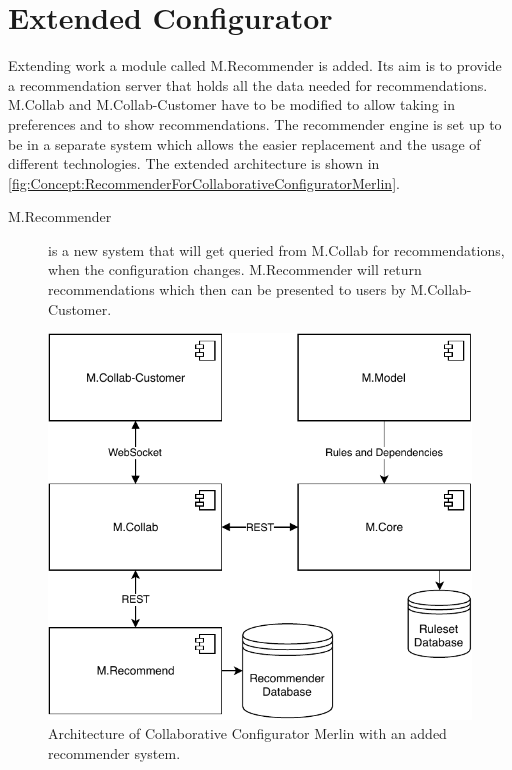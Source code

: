 \section{Extended Configurator}
\label{sec:Concept:ExtendedConfigurator}

Extending \citeauthor{raabKollaborativeProduktkonfigurationEchtzeit2019} work a module called M.Recommender is added. Its aim is to provide a recommendation server that holds all the data needed for recommendations. M.Collab and M.Collab-Customer have to be modified to allow taking in preferences and to show  recommendations. The recommender engine is set up to be in a separate system which allows the easier replacement and the usage of different technologies. The extended architecture is shown in \autoref{fig:Concept:RecommenderForCollaborativeConfiguratorMerlin}.

\begin{description}
    \item[M.Recommender] is a new system that will get queried from M.Collab for recommendations, when the configuration changes. M.Recommender will return recommendations which then can be presented to users by M.Collab-Customer.
\end{description}

\begin{figure}
    \centering
    \includegraphics{./figures/MerlinCollabRecommender.pdf}
    \caption{Architecture of Collaborative Configurator Merlin with an added recommender system.}
    \label{fig:Concept:RecommenderForCollaborativeConfiguratorMerlin}
\end{figure}